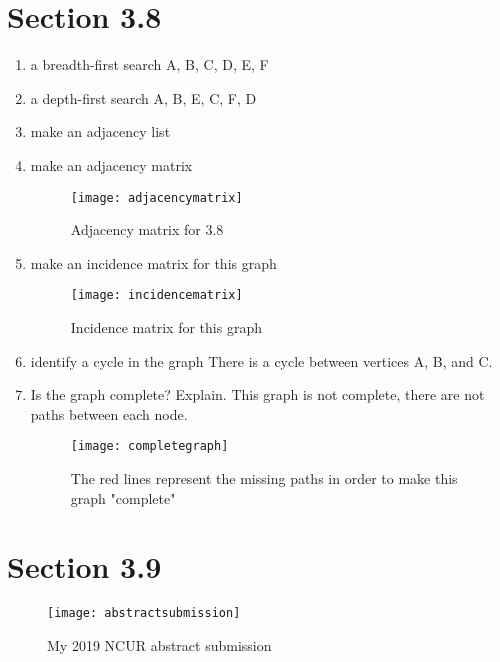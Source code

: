 \documentclass[11pt]{article}
\begin{document}
\section*{Section 3.8}
\begin{enumerate}
    \item a breadth-first search \newline
    A, B, C, D, E, F
    
    \item a depth-first search \newline
    A, B, E, C, F, D
    
    \item make an adjacency list
    
    \item make an adjacency matrix
    \begin{figure}
        \centering
        \texttt{[image: adjacencymatrix]}
        \caption{Adjacency matrix for 3.8}
        \label{fig:my_label}
    \end{figure}
    \item make an incidence matrix for this graph
    \begin{figure}
        \centering
        \texttt{[image: incidencematrix]}
        \caption{Incidence matrix for this graph}
        \label{fig:my_label}
    \end{figure}
    
    \item identify a cycle in the graph \newline
    There is a cycle between vertices A, B, and C.
    
    \item Is the graph complete? Explain. \newline
    This graph is not complete, there are not paths between each node.
    
    \begin{figure}
        \centering
        \texttt{[image: completegraph]}
        \caption{The red lines represent the missing paths in order to make this graph "complete"}
        \label{fig:my_label}
    \end{figure}
\end{enumerate}

\section*{Section 3.9}
\begin{figure}
    \centering
    \texttt{[image: abstractsubmission]}
    \caption{My 2019 NCUR abstract submission}
    \label{fig:my_label}
\end{figure}
\end{document}
